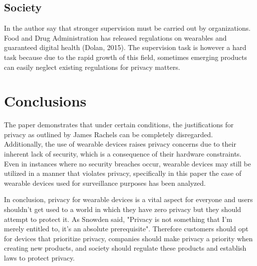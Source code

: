 \documentclass{article}
\begin{document}
\subsection{Society}
In \cite{chang_ethical_2019} the author say that stronger supervision must be carried out by organizations. Food and Drug Administration has released regulations on wearables and guaranteed digital health (Dolan, 2015).
The supervision task is however a hard task because due to the rapid growth of this field, sometimes emerging products can easily neglect existing regulations for privacy matters. 
\section{Conclusions}
The paper demonstrates that under certain conditions, the justifications for privacy as outlined by James Rachels \cite{rachels_why_1975} can be completely disregarded. Additionally, the use of wearable devices raises privacy concerns due to their inherent lack of security, which is a consequence of their hardware constraints. Even in instances where no security breaches occur, wearable devices may still be utilized in a manner that violates privacy, specifically in this paper the case of wearable devices used for surveillance purposes has been analyzed.

In conclusion, privacy for wearable devices is a vital aspect for everyone and users shouldn't get used to a world in which they have zero privacy but they should attempt to protect it. As Snowden said, "Privacy is not something that I'm merely entitled to, it's an absolute prerequisite". Therefore customers should opt for devices that prioritize privacy, companies should make privacy a priority when creating new products, and society should regulate these products and establish laws to protect privacy.
\end{document}
